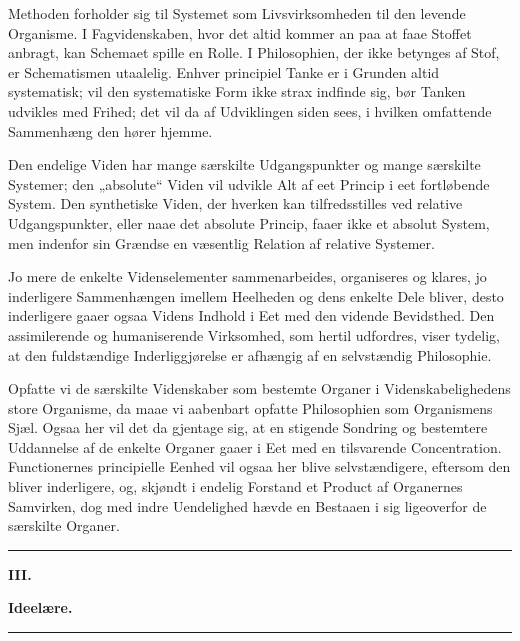 \documentclass[12pt]{book}
\newcommand{\opage}[1]{\marginnote{\footnotesize\textit{[#1]}}}
\begin{document}
Methoden forholder sig til Systemet som Livsvirksomheden til den levende Organisme. I
Fagvidenskaben, hvor det altid kommer an paa at faae Stoffet anbragt, kan Schemaet spille en
Rolle. I Philosophien, der ikke betynges af Stof, er Schematismen utaalelig. Enhver
principiel Tanke er i Grunden altid systematisk; vil den systematiske Form ikke strax
indfinde sig, bør Tanken udvikles med Frihed; det
\opage{117} vil da af Udviklingen siden sees, i hvilken omfattende Sammenhæng den hører hjemme.

Den endelige Viden har mange særskilte Udgangspunkter og mange særskilte Systemer; den
„absolute“ Viden vil udvikle Alt af eet Princip i eet fortløbende System. Den synthetiske
Viden, der hverken kan tilfredsstilles ved relative Udgangspunkter, eller naae det absolute
Princip, faaer ikke et absolut System, men indenfor sin Grændse en væsentlig Relation af
relative Systemer.

Jo mere de enkelte Videnselementer sammenarbeides, organiseres og klares, jo inderligere
Sammenhængen imellem Heelheden og dens enkelte Dele bliver, desto inderligere gaaer ogsaa
Videns Indhold i Eet med den vidende Bevidsthed. Den assimilerende og humaniserende
Virksomhed, som hertil udfordres, viser tydelig, at den fuldstændige Inderliggjørelse er
afhængig af en selvstændig Philosophie.

Opfatte vi de særskilte Videnskaber som bestemte Organer i Videnskabelighedens store
Organisme, da maae vi aabenbart opfatte Philosophien som Organismens Sjæl. Ogsaa her vil det
da gjentage sig, at en stigende Sondring og bestemtere Uddannelse af de enkelte Organer gaaer
i Eet med en tilsvarende Concentration. Functionernes principielle Eenhed vil ogsaa her blive
selvstændigere, eftersom den bliver inderligere, og, skjøndt i endelig Forstand et Product af
Organernes Samvirken, dog med indre Uendelighed hævde en Bestaaen i sig ligeoverfor de
særskilte Organer.

\begin{center}\rule{0.35\linewidth}{0.4pt}\end{center}

\opage{118} \begin{center}
  {\large\bfseries III.}\par\vspace{4pt}
  {\Large\bfseries Ideelære.}\par\vspace{4pt}
  \rule{2.5cm}{0.4pt}
\end{center}
{}
\end{document}
